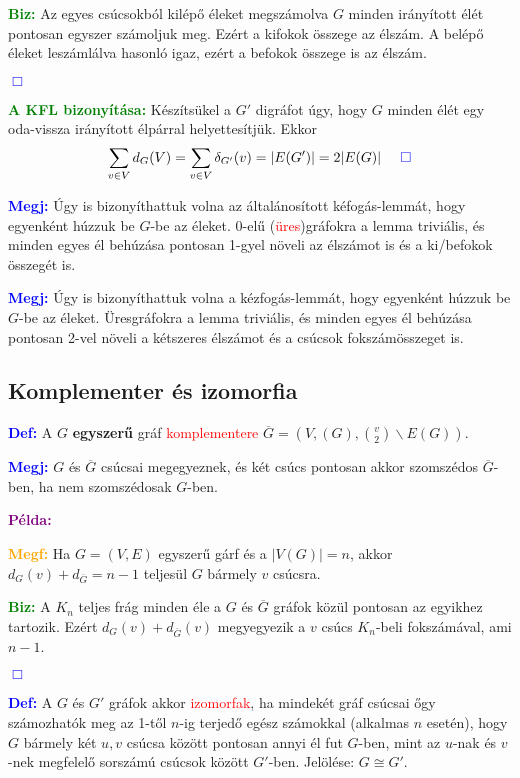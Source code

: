 \documentclass[12pt]{article}
\begin{document}
			\textcolor{green}{\textbf{Biz:}} Az egyes csúcsokból kilépő éleket megszámolva $G$ minden irányított élét pontosan egyszer számoljuk meg. Ezért a kifokok összege az élszám. A belépő éleket leszámlálva hasonló igaz, ezért a befokok összege is az élszám. \raggedright \textcolor{blue}{$\Box$} 
			
			\textcolor{green}{\textbf{A KFL bizonyítása:}} Készítsükel a $G'$ digráfot úgy, hogy $G$ minden élét egy oda-vissza irányított élpárral helyettesítjük. Ekkor \[\sum_{v \in V} d_G(V) = \sum_{v \in V} \delta_{G'} (v) = |E(G')| = 2|E(G)| \;\;\;\;\;\textcolor{blue}{\Box} \]

			\textcolor{blue}{\textbf{Megj:}} Úgy is bizonyíthattuk volna az általánosított kéfogás-lemmát, hogy egyenként húzzuk be $G$-be az éleket. 0-elű (\textcolor{red}{üres})gráfokra a lemma triviális, és minden egyes él behúzása pontosan 1-gyel növeli az élszámot is és a ki/befokok összegét is.

			\textcolor{blue}{\textbf{Megj:}} Úgy is bizonyíthattuk volna a kézfogás-lemmát, hogy egyenként húzzuk be $G$-be az éleket. Üresgráfokra a lemma triviális, és minden egyes él behúzása pontosan 2-vel növeli a kétszeres élszámot és a csúcsok fokszámösszeget is.

		\subsection{Komplementer és izomorfia}

			\textcolor{blue}{\textbf{Def:}}	A $G$ \textbf{egyszerű} gráf \textcolor{red}{komplementere} $\overline{G} = (V,(G), \binom{v}{2} \backslash E(G))$.

			\textcolor{blue}{\textbf{Megj:}} $G$ és $\overline{G}$ csúcsai megegyeznek, és két csúcs pontosan akkor szomszédos $\overline{G}$-ben, ha nem szomszédosak $G$-ben.

			\textcolor{purple}{\textbf{Példa:}}

			\textcolor{orange}{\textbf{Megf:}} Ha $G = (V,E)$ egyszerű gárf és a $|V(G)| = n$, akkor $d_G(v)+d_{\overline{G}}=n-1$ teljesül $G$ bármely $v$ csúcsra.

			\textcolor{green}{\textbf{Biz:}} A $K_n$ teljes frág minden éle a $G$ és $\overline{G}$ gráfok közül pontosan az egyikhez tartozik. Ezért $d_G (v) + d_{\overline{G}}(v)$ megyegyezik a $v$ csúcs $K_n$-beli fokszámával, ami $n-1$. \raggedright \textcolor{blue}{$\Box$} 

			\textcolor{blue}{\textbf{Def:}} A $G$ és $G'$ gráfok akkor \textcolor{red}{izomorfak}, ha mindekét gráf csúcsai őgy számozhatók meg az 1-től $n$-ig terjedő egész számokkal (alkalmas $n$ esetén), hogy $G$ bármely két $u,v$ csúcsa között pontosan annyi él fut $G$-ben, mint az $u$-nak és $v$-nek megfelelő sorszámú csúcsok között $G'$-ben. Jelölése: $G \cong G'$.
			
\end{document}
